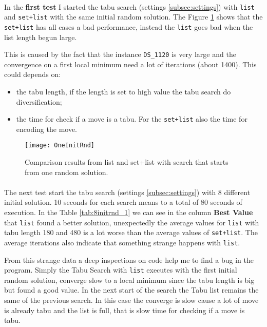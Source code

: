 \documentclass[]{article}
\begin{document}
	
	
	\paragraph*{}
	In the \textbf{first test} I started the tabu search (settings \ref{subsec:settings}) with \verb|list| and \verb|set+list| with the same initial random solution. The Figure \ref{fig:oneinitrnd} shows that the \verb|set+list| has all cases a bad performance, instead the \verb|list| goes bad when the list length begun large.
	
	This is caused by the fact that the instance \verb|DS_1120| is very large and the convergence on a first local minimum need a lot of iterations (about 1400). This could depends on:
	\begin{itemize}
		\item the tabu length, if the length is set to high value the tabu search do diversification;
		\item the time for check if a move is a tabu. For the \verb|set+list| also the time for encoding the move.
	\end{itemize} 
	
	\begin{figure}
		\centering
		\texttt{[image: OneInitRnd]}
		\caption{Comparison results from list and set+list with search that starts from one random solution.}
		\label{fig:oneinitrnd}
	\end{figure}
	
	
	\paragraph*{}
	The next test start the tabu search (settings \ref{subsec:settings}) with 8 different initial solution. 10 seconds for each search means to a total of 80 seconds of execution. In the Table \ref{tab:8initrnd_1} we can see in the column \textbf{Best Value} that \verb|list| found a better solution, unexpectedly the average values for \verb|list| with tabu length 180 and 480 is a lot worse than the average values of \verb|set+list|. The average iterations also indicate that something strange happens with \verb|list|. 
	
	From this strange data a deep inspections on code help me to find a bug in the program. Simply the Tabu Search with \verb|list| executes with the first initial random solution, converge slow to a local minimum since the tabu length is big but found a good value. In the next start of the search the Tabu list remains the same of the previous search. In this case the converge is slow cause a lot of move is already tabu and the list is full, that is slow time for checking if a move is tabu.
	
\end{document}
